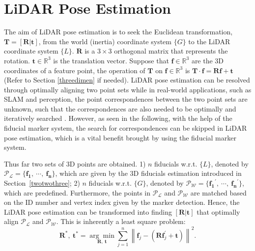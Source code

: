 \section{LiDAR Pose Estimation} \label{3.3}
The aim of LiDAR pose estimation is to seek the Euclidean transformation, $\mathbf{T}=[\mathbf{R}| \mathbf{t}]$, from the world (inertia) coordinate system $\{G\}$ to the LiDAR coordinate system $\{L\}$.  $\mathbf{R}$ is a $3\times3$ orthogonal matrix that represents the rotation. $\mathbf{t}\in\mathbb{R}^{3}$ is the translation vector. Suppose that $\mathbf{f} \in \mathbb{R}^{3}$ are the 3D coordinates of a feature point, the operation of $\mathbf{T}$ on $\mathbf{f} \in \mathbb{R}^{3}$ is $\mathbf{T} \cdot \mathbf{f} = \mathbf{R}\mathbf{f}+\mathbf{t}$ (Refer to Section \ref{threedimen} if needed). LiDAR pose estimation can be resolved through optimally aligning two point sets while in real-world applications, such as SLAM and perception, the point correspondences between the two point sets are unknown, such that the correspondences are also needed to be optimally and iteratively searched \cite{nicp}. However, as seen in the following, with the help of the fiducial marker system, the search for correspondences can be skipped in LiDAR pose estimation, which is a vital benefit brought by using the fiducial marker system.

Thus far two sets of 3D points are obtained. 1) $n$ fiducials w.r.t. $\{L\}$, denoted by $\mathcal{{P}_{L}} = \{ \mathbf{{f}_{1}}, \ \cdots, \ \mathbf{{f}_{n}}\}$, which are given by the 3D fiducials estimation introduced in Section~\ref{twotwothree}; 2) $n$ fiducials w.r.t. $\{G\}$, denoted by $\mathcal{{P}_{W}}= \{ \mathbf{{f}_{1}}^{\prime}, \ \cdots, \ \mathbf{{f}_{n}}^{\prime} \}$, which are predefined. Furthermore, the points in $\mathcal{{P}_{L}} $ and $\mathcal{{P}_{W}}$ are matched based on the ID number and vertex index given by the marker detection. Hence, the LiDAR pose estimation can be transformed into finding $[\mathbf{R}|\mathbf{t}]$ that optimally align $\mathcal{{P}_{L}} $ and $\mathcal{{P}_{W}}$. This is inherently a least square problem:
\begin{equation}	
	\mathbf{R}^{*},\  \mathbf{t}^{*}=\underset{\mathbf{R},\  \mathbf{t}}{\arg \min } \sum_{j=1}^{n}\left\|\mathbf{f}_{j}-\left(\mathbf{R} \mathbf{f}_{j}^{\prime}+\mathbf{t}\right)\right\|^{2}. \label{least}
\end{equation}
	
